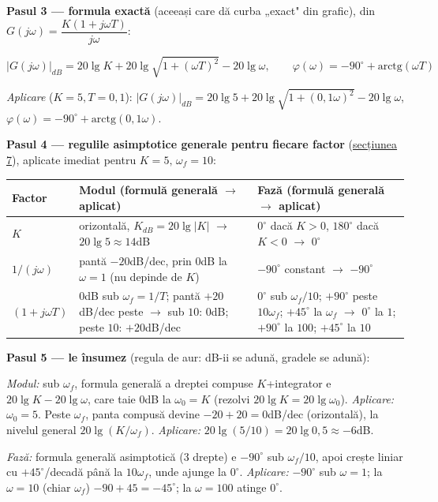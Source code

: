 \documentclass[10pt,a4paper]{article}
\begin{document}
\textbf{Pasul 3 — formula exactă} (aceeași care dă curba „exact" din grafic), din $G(j\omega)=\dfrac{K(1+j\omega T)}{j\omega}$:
\begin{keyeq}\color{red!65!black}
$$|G(j\omega)|_{dB}=20\lg K+20\lg\sqrt{1+(\omega T)^2}-20\lg\omega,\qquad \varphi(\omega)=-90^\circ+\mathrm{arctg}(\omega T)$$
\end{keyeq}
\textit{Aplicare} ($K{=}5,T{=}0{,}1$): $|G(j\omega)|_{dB}=20\lg5+20\lg\sqrt{1+(0{,}1\omega)^2}-20\lg\omega$,\quad $\varphi(\omega)=-90^\circ+\mathrm{arctg}(0{,}1\omega)$.

\textbf{Pasul 4 — regulile asimptotice generale pentru fiecare factor} (\hyperref[sec:7]{secțiunea 7}), aplicate imediat pentru $K{=}5,\,\omega_f{=}10$:
\begin{center}
\footnotesize
\begin{tabular}{|p{2.5cm}|p{6.6cm}|p{6.9cm}|}
\hline
\textbf{Factor} & \textbf{Modul (formulă generală $\to$ aplicat)} & \textbf{Fază (formulă generală $\to$ aplicat)} \\\hline
$K$ & orizontală, $K_{dB}{=}20\lg|K|$ $\to$ $20\lg5\approx14$dB & $0^\circ$ dacă $K{>}0$, $180^\circ$ dacă $K{<}0$ $\to$ $0^\circ$ \\\hline
$1/(j\omega)$ & pantă $-20$dB/dec, prin $0$dB la $\omega{=}1$ (nu depinde de $K$) & $-90^\circ$ constant $\to$ $-90^\circ$ \\\hline
$(1{+}j\omega T)$ & $0$dB sub $\omega_f{=}1/T$; pantă $+20$dB/dec peste $\to$ sub $10$: $0$dB; peste $10$: $+20$dB/dec & $0^\circ$ sub $\omega_f/10$; $+90^\circ$ peste $10\omega_f$; $+45^\circ$ la $\omega_f$ $\to$ $0^\circ$ la $1$; $+90^\circ$ la $100$; $+45^\circ$ la $10$ \\\hline
\end{tabular}
\end{center}

\textbf{Pasul 5 — le însumez} (regula de aur: dB-ii se adună, gradele se adună):

\textit{Modul:} sub $\omega_f$, formula generală a dreptei compuse $K$+integrator e $20\lg K-20\lg\omega$, care taie $0$dB la $\omega_0=K$ (rezolvi $20\lg K=20\lg\omega_0$). \textit{Aplicare:} $\omega_0{=}5$. Peste $\omega_f$, panta compusă devine $-20{+}20{=}0$dB/dec (orizontală), la nivelul general $20\lg(K/\omega_f)$. \textit{Aplicare:} $20\lg(5/10){=}20\lg0{,}5\approx-6$dB.

\textit{Fază:} formula generală asimptotică (3 drepte) e $-90^\circ$ sub $\omega_f/10$, apoi crește liniar cu $+45^\circ$/decadă până la $10\omega_f$, unde ajunge la $0^\circ$. \textit{Aplicare:} $-90^\circ$ sub $\omega{=}1$; la $\omega{=}10$ (chiar $\omega_f$) $-90{+}45{=}-45^\circ$; la $\omega{=}100$ atinge $0^\circ$.
\end{document}
